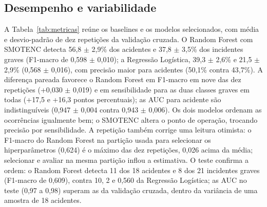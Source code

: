 \documentclass[12pt]{article}
\begin{document}
\subsection{Desempenho e variabilidade}
\label{sec:desempenho}

A Tabela~\ref{tab:metricas} reúne os baselines e os modelos selecionados, com média e desvio-padrão de dez repetições da validação cruzada. O Random Forest com SMOTENC detecta 56,8 $\pm$ 2,9\% dos acidentes e 37,8 $\pm$ 3,5\% dos incidentes graves (F1-macro de 0,598 $\pm$ 0,010); a Regressão Logística, 39,3 $\pm$ 2,6\% e 21,5 $\pm$ 2,9\% (0,568 $\pm$ 0,016), com precisão maior para acidentes (50,1\% contra 43,7\%). A diferença pareada favorece o Random Forest em F1-macro em nove das dez repetições (+0,030 $\pm$ 0,019) e em sensibilidade para as duas classes graves em todas (+17,5 e +16,3 pontos percentuais); as AUC para acidente são indistinguíveis (0,947 $\pm$ 0,004 contra 0,943 $\pm$ 0,006). Os dois modelos ordenam as ocorrências igualmente bem; o SMOTENC altera o ponto de operação, trocando precisão por sensibilidade. A repetição também corrige uma leitura otimista: o F1-macro do Random Forest na partição usada para selecionar os hiperparâmetros (0,624) é o máximo das dez repetições, 0,026 acima da média; selecionar e avaliar na mesma partição inflou a estimativa. O teste confirma a ordem: o Random Forest detecta 11 dos 18 acidentes e 8 dos 21 incidentes graves (F1-macro de 0,609), contra 10, 2 e 0,560 da Regressão Logística; as AUC no teste (0,97 a 0,98) superam as da validação cruzada, dentro da variância de uma amostra de 18 acidentes.
\end{document}
